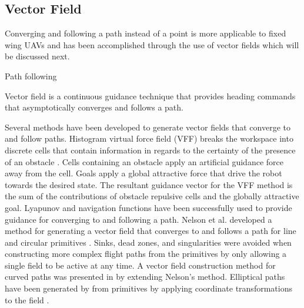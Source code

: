 \documentclass[numbered,pdftex]{ohio-etd}
\begin{document}
%
%
%






\subsection{Vector Field}

Converging and following a path instead of a point is more applicable to fixed wing UAVs and has been accomplished through the use of vector fields which will be discussed next.

Path following  

Vector field is a continuous guidance technique that provides heading commands that asymptotically converges and follows a path. 


Several methods have been developed to generate vector fields that converge to and follow paths. Histogram virtual force field (VFF) breaks the workspace into discrete cells that contain information in regards to the certainty of the presence of an obstacle \cite{borenstein_real-time_1990} \cite{borenstein_vector_1991}. Cells containing an obstacle apply an artificial guidance force away from the cell. Goals apply a global attractive force that drive the robot towards the desired state. The resultant guidance vector for the VFF method is the sum of the contributions of obstacle repulsive cells and the globally attractive goal. Lyapunov and navigation functions have been successfully used to provide guidance for converging to and following a path. Nelson et al. developed a method for generating a vector field that converges to and follows a path for line and circular primitives \cite{nelson_cooperative_2005}. Sinks, dead zones, and singularities were avoided when constructing more complex flight paths from the primitives by only allowing a single field to be active at any time. A vector field construction method for curved paths was presented in \cite{griffiths_vector_2006} by extending Nelson's method. Elliptical paths have been generated by from primitives by applying coordinate transformations to the field \cite{frew_lyapunov_nodate}.
\end{document}

